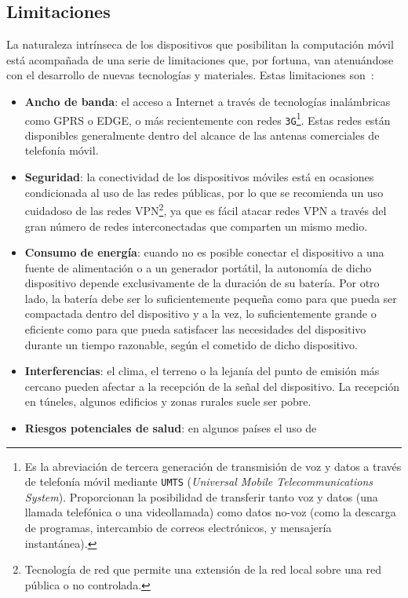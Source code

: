   \subsection{Limitaciones}
La naturaleza intrínseca de los dispositivos que posibilitan la computación 
móvil está acompañada de una serie de limitaciones que, por fortuna, van
atenuándose con el desarrollo de nuevas tecnologías y materiales. Estas
limitaciones son~\cite{bib:wikiMobileComputing}:
\begin{itemize}
\item \textbf{Ancho de banda}: el acceso a Internet a través de tecnologías
inalámbricas como \acs{GPRS} o \acs{EDGE}, o más recientemente con redes
\texttt{3G}\footnote{Es la abreviación de tercera generación de transmisión de 
voz y datos a través de telefonía móvil mediante \texttt{UMTS} (\emph{Universal 
Mobile Telecommunications System}). Proporcionan la posibilidad de transferir 
tanto voz y datos (una llamada telefónica o una videollamada) como datos no-voz 
(como la descarga de programas, intercambio de correos electrónicos, y 
mensajería instantánea).}. Estas redes están disponibles generalmente dentro
del alcance de las antenas comerciales de telefonía móvil.
\item \textbf{Seguridad}: la conectividad de los dispositivos móviles está
en ocasiones condicionada al uso de las redes públicas, por lo que se
recomienda un uso cuidadoso de las redes \acs{VPN}\footnote{Tecnología de red
que permite una extensión de la red local sobre una red pública o no
controlada.}, ya que es fácil atacar redes \acs{VPN} a través del gran número
de redes interconectadas que comparten un mismo medio.
\item \textbf{Consumo de energía}: cuando no es posible conectar el dispositivo
a una fuente de alimentación o a un generador portátil, la autonomía de dicho
dispositivo depende exclusivamente de la duración de su batería. Por otro lado,
la batería debe ser lo suficientemente pequeña como para que pueda ser
compactada dentro del dispositivo y a la vez, lo suficientemente grande o
eficiente como para que pueda satisfacer las necesidades del dispositivo
durante un tiempo razonable, según el cometido de dicho dispositivo.
\item \textbf{Interferencias}: el clima, el terreno o la lejanía del punto de
emisión más cercano pueden afectar a la recepción de la señal del dispositivo.
La recepción en túneles, algunos edificios y zonas rurales suele ser pobre.
\item \textbf{Riesgos potenciales de salud}: en algunos países el uso de

\end{itemize}
